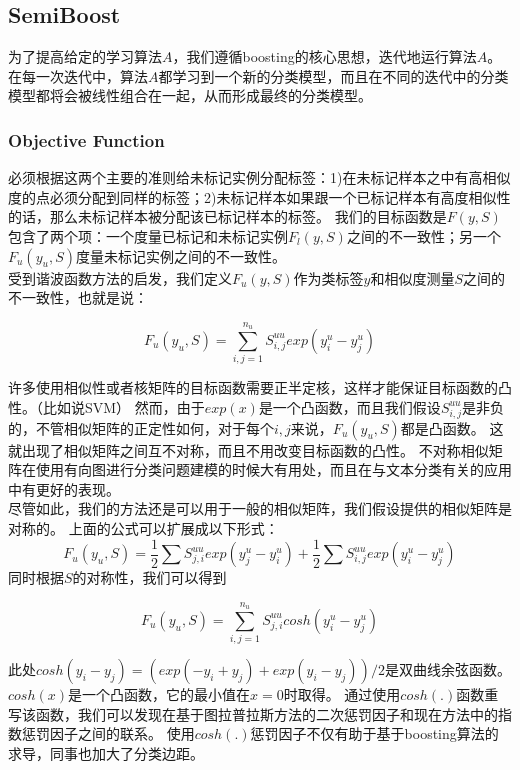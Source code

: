\documentclass[10pt,journal,compsoc]{IEEEtran}
\begin{document}
\subsection{SemiBoost}
为了提高给定的学习算法$A$，我们遵循boosting的核心思想，迭代地运行算法$A$。
在每一次迭代中，算法$A$都学习到一个新的分类模型，而且在不同的迭代中的分类模型都将会被线性组合在一起，从而形成最终的分类模型。
\subsubsection{Objective Function}
必须根据这两个主要的准则给未标记实例分配标签：1)在未标记样本之中有高相似度的点必须分配到同样的标签；2)未标记样本如果跟一个已标记样本有高度相似性的话，那么未标记样本被分配该已标记样本的标签。
我们的目标函数是$F(y, S)$包含了两个项：一个度量已标记和未标记实例$F_l(y,S)$之间的不一致性；另一个$F_u(y_u, S)$度量未标记实例之间的不一致性。\\
受到谐波函数方法的启发，我们定义$F_u(y, S)$作为类标签$y$和相似度测量$S$之间的不一致性，也就是说：
\begin{center}
\begin{equation}
F_u(y_u, S)=\sum^{n_u}_{i,j=1}S^{uu}_{i,j}exp(y^u_i-y^u_j)
\end{equation}
\end{center}
许多使用相似性或者核矩阵的目标函数需要正半定核，这样才能保证目标函数的凸性。（比如说SVM）
然而，由于$exp(x)$是一个凸函数，而且我们假设$S^{uu}_{i,j}$是非负的，不管相似矩阵的正定性如何，对于每个$i,j$来说，$F_u(y_u,S)$都是凸函数。
这就出现了相似矩阵之间互不对称，而且不用改变目标函数的凸性。
不对称相似矩阵在使用有向图进行分类问题建模的时候大有用处，而且在与文本分类有关的应用中有更好的表现。\\
尽管如此，我们的方法还是可以用于一般的相似矩阵，我们假设提供的相似矩阵是对称的。
上面的公式可以扩展成以下形式：
\[F_u(y_u,S)=\frac{1}{2}\sum S^{uu}_{j,i}exp(y_j^u-y_i^u)+\frac 12\sum S^{uu}_{i,j}exp(y^u_i-y^u_j)\]
同时根据$S$的对称性，我们可以得到
\begin{center}
\begin{equation}
F_u(y_u,S)=\sum^{n_u}_{i,j=1}S^{uu}_{j,i}cosh(y_i^u-y_j^u)\end{equation}
\end{center}
此处$cosh(y_i-y_j)=(exp(-y_i+y_j)+exp(y_i-y_j))/2$是双曲线余弦函数。$cosh(x)$是一个凸函数，它的最小值在$x=0$时取得。
通过使用$cosh(.)$函数重写该函数，我们可以发现在基于图拉普拉斯方法的二次惩罚因子和现在方法中的指数惩罚因子之间的联系。
使用$cosh(.)$惩罚因子不仅有助于基于boosting算法的求导，同事也加大了分类边距。
\end{document}
